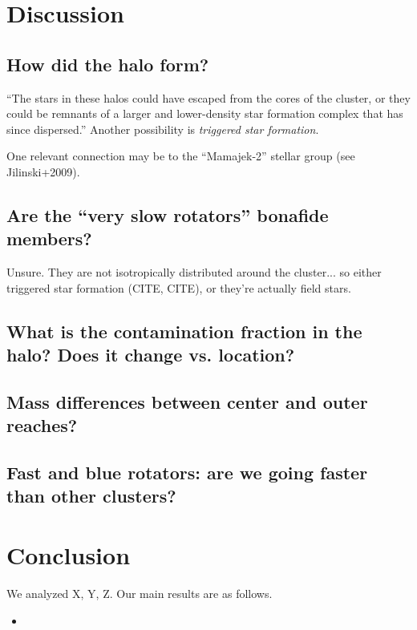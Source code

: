 \documentclass[12pt,twocolumn,tighten]{aastex63}
\begin{document}
\section{Discussion}
\label{sec:discussion}

\subsection{How did the halo form?}
``The stars in these halos could have escaped from the cores of the
cluster, or they could be remnants of a larger and lower-density star
formation complex that has since dispersed.''
Another possibility is {\it triggered star formation}.

One relevant connection may be to the ``Mamajek-2'' stellar group
(see Jilinski+2009).





\subsection{Are the ``very slow rotators'' bonafide members?}
Unsure. They are not isotropically distributed around the
cluster... so either triggered star formation (CITE, CITE), or they're
actually field stars.

\subsection{What is the contamination fraction in the halo? Does it change vs. location?}

\subsection{Mass differences between center and outer reaches?}

\subsection{Fast and blue rotators: are we going faster than other clusters?}

\section{Conclusion}
\label{sec:conclusion}

We analyzed X, Y, Z.
Our main results are as follows.
\begin{itemize}
	\item 
\end{itemize}
\end{document}
